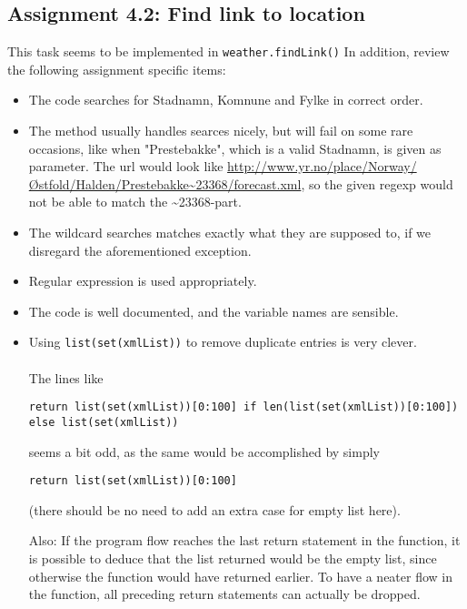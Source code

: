 \documentclass[a4paper]{article}
\begin{document}
\subsection*{Assignment 4.2: Find link to location}
This task seems to be implemented in \texttt{weather.findLink()}
In addition, review the following assignment specific items: 
\begin{itemize}
\item The code searches for Stadnamn, Komnune and Fylke in correct order.
\item The method usually handles searces nicely, but will fail on some rare occasions, like when "Prestebakke", which is a valid Stadnamn, is given as parameter. The url would look like \url{http://www.yr.no/place/Norway/Østfold/Halden/Prestebakke~23368/forecast.xml}, so the given regexp would not be able to match the \textasciitilde 23368-part.
\item The wildcard searches matches exactly what they are supposed to, if we disregard the aforementioned exception.
  \item Regular expression is used appropriately.
  \item The code is well documented, and the variable names are sensible.
  \item
Using \texttt{list(set(xmlList))} to remove duplicate entries is very clever. 
\\ \\
The lines like

\begin{verbatim}
return list(set(xmlList))[0:100] if len(list(set(xmlList))[0:100]) else list(set(xmlList)) 
\end{verbatim}
seems a bit odd, as the same would be accomplished by simply

\begin{verbatim}
return list(set(xmlList))[0:100]
\end{verbatim}
(there should be no need to add an extra case for empty list here).

Also:
If the program flow reaches the last return statement in the function, it is possible to deduce that the list returned would be the empty list, since otherwise the function would have returned earlier. To have a neater flow in the function, all preceding return statements can actually be dropped.

\end{itemize}
\end{document}
